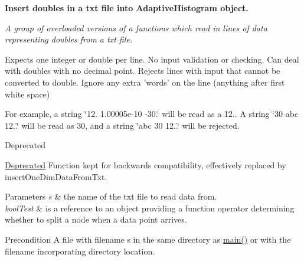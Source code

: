\begin{Indent}{\bf \-Insert doubles in a txt file into \-Adaptive\-Histogram object.}\par
{\em \-A group of overloaded versions of a functions which read in lines of data representing doubles from a txt file.

\-Expects one integer or double per line. \-No input validation or checking. \-Can deal with doubles with no decimal point. \-Rejects lines with input that cannot be converted to double. \-Ignore any extra 'words' on the line (anything after first white space)

\-For example, a string \char`\"{}12. 1.\-00005e-\/10 -\/30.\char`\"{} will be read as a 12.. \-A string \char`\"{}30 abc 12..\char`\"{} will be read as 30, and a string \char`\"{}abc 30 12..\char`\"{} will be rejected.

\begin{DoxyRefDesc}{\-Deprecated}
\item[\hyperlink{deprecated__deprecated000001}{\-Deprecated}]\-Function kept for backwards compatibility, effectively replaced by insert\-One\-Dim\-Data\-From\-Txt.\end{DoxyRefDesc}



\begin{DoxyParams}{\-Parameters}
{\em s} & the name of the txt file to read data from. \\
\hline
{\em bool\-Test} & is a reference to an object providing a function operator determining whether to split a node when a data point arrives. \\
\hline
\end{DoxyParams}
\begin{DoxyPrecond}{\-Precondition}
\-A file with filename s in the same directory as \hyperlink{Exm__3__3_8cpp_ae66f6b31b5ad750f1fe042a706a4e3d4}{main()} or with the filename incorporating directory location. 
\end{DoxyPrecond}

}
\end{Indent}
